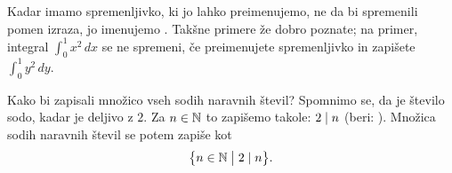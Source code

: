 Kadar imamo spremenljivko, ki jo lahko preimenujemo, ne da bi spremenili pomen izraza, jo imenujemo . Takšne primere že dobro poznate; na primer, integral $\int_0^1 x^2 \,dx$ se ne spremeni, če preimenujete spremenljivko in zapišete $\int_0^1 y^2 \,dy$.

\begin{zgled}
Kako bi zapisali množico vseh sodih naravnih števil? Spomnimo se, da je število sodo, kadar je deljivo z $2$. Za $n \in \mathbb{N}$ to zapišemo takole: $2 \mid n$ (beri: ). Množica sodih naravnih števil se potem zapiše kot
\[\set[1]{n \in \NN}{\divides{2}{n}}.\]
\end{zgled}

